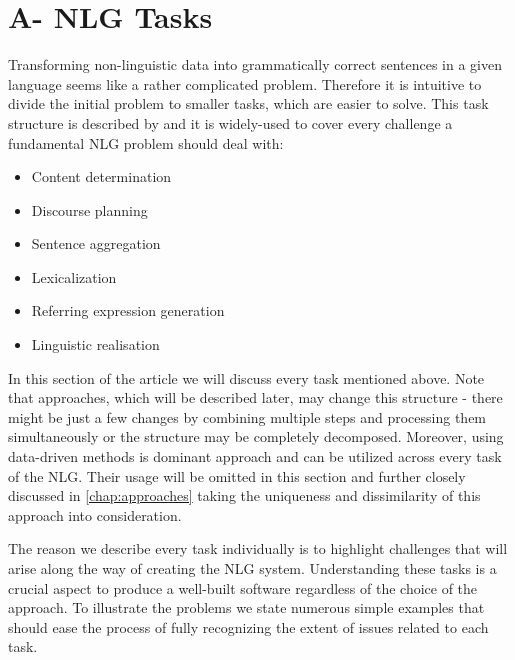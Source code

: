 \chapter{A- NLG Tasks}\label{chap:tasks}
Transforming non-linguistic data into grammatically correct sentences in a given language seems like a rather complicated problem. Therefore it is intuitive to divide the initial problem to smaller tasks, which are easier to solve. This task structure is described by \cite{reiter1997building} and it is widely-used to cover every challenge a fundamental NLG problem should deal with:
\begin{itemize}
	\item Content determination
	\item Discourse planning
	\item Sentence aggregation
	\item Lexicalization
	\item Referring expression generation
	\item Linguistic realisation
\end{itemize}

In this section of the article we will discuss every task mentioned above. Note that approaches, which will be described later, may change this structure - there might be just a few changes by combining multiple steps and processing them simultaneously or the structure may be completely decomposed. Moreover, using data-driven methods is dominant approach and can be utilized across every task of the NLG. Their usage will be omitted in this section and further closely discussed in \autoref{chap:approaches} taking the uniqueness and dissimilarity of this approach into consideration.

The reason we describe every task individually is to highlight challenges that will arise along the way of creating the NLG system. Understanding these tasks is a crucial aspect to produce a well-built software regardless of the choice of the approach. To illustrate the problems we state numerous simple examples that should ease the process of fully recognizing the extent of issues related to each task.

